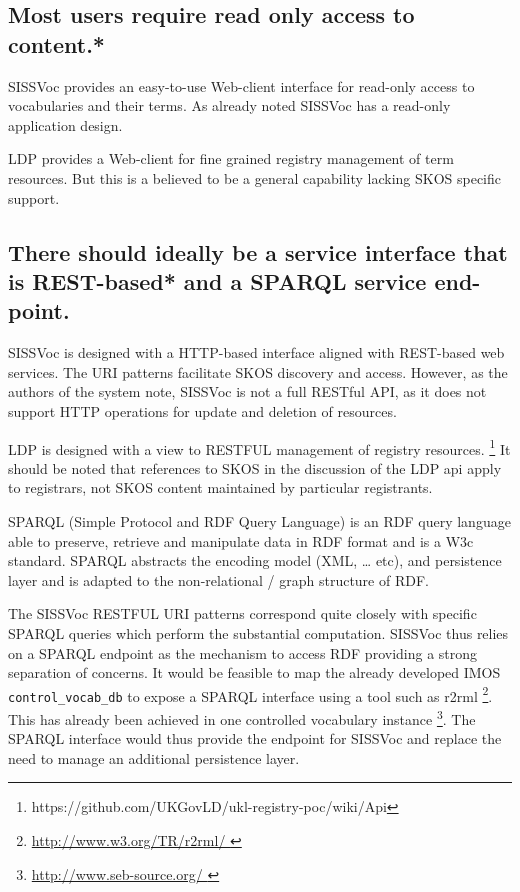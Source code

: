 \documentclass[10pt,a4paper]{article}
\begin{document}
\begin{flushleft}
\subsection{ 
  Most users require read only access to content.* 
}
  \item SISSVoc provides an easy-to-use Web-client interface for read-only access to 
  vocabularies and their terms.  As already noted SISSVoc has a read-only application design.
 
  \item LDP provides a Web-client for fine grained registry management of term
resources. But this is a believed to be a general capability lacking SKOS specific support.


\subsection{ 
  There should ideally be a service interface that is REST-based* and a 
  SPARQL service end-point.
}

     \item SISSVoc is designed with a HTTP-based interface aligned with
  REST-based web services. The URI patterns facilitate SKOS discovery and access.
  However, as the authors of the system note, SISSVoc is not a full RESTful API, as 
  it does not support HTTP operations for update and deletion of resources.
      
    \item  LDP is designed with a view to RESTFUL management of registry
  resources.  \footnote { https://github.com/UKGovLD/ukl-registry-poc/wiki/Api }
  It should be noted that references to SKOS in the discussion of the LDP api
  apply to registrars, not SKOS content maintained by particular registrants.  

      \item SPARQL (Simple Protocol and RDF Query Language) is an RDF query
  language able to preserve, retrieve and manipulate data in RDF format and is a
  W3c standard.  SPARQL abstracts the encoding model (XML, … etc), and
  persistence layer and is adapted to the non-relational / graph structure of
  RDF.

   \item   The SISSVoc RESTFUL URI patterns correspond quite closely with
  specific SPARQL queries which perform the substantial computation. SISSVoc thus relies
  on a SPARQL endpoint as the mechanism to access RDF providing a strong
  separation of concerns. It would be feasible to map the already developed IMOS
  \texttt{control\_vocab\_db} to expose a SPARQL interface using a tool such as
  r2rml \footnote{ \url{ http://www.w3.org/TR/r2rml/ } }. This has already been
  achieved in one controlled vocabulary instance \footnote{ \url{ http://www.seb-source.org/ } }. 
  The SPARQL interface would thus provide the endpoint for SISSVoc and replace the 
  need to manage an additional persistence layer.


\end{flushleft}
\end{document}
